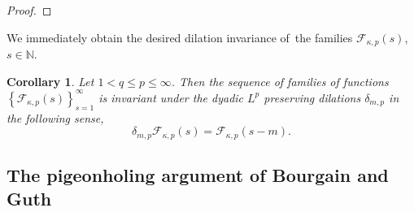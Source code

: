 \documentclass{amsart}%
\theoremstyle{plain}
\newtheorem{corollary}[theorem]{Corollary}
\numberwithin{equation}{section}
\begin{document}
\begin{proof}
\end{proof}

We immediately obtain the desired dilation invariance of\ the families
$\mathcal{F}_{\kappa,p}\left(  s\right)  $, $s\in\mathbb{N}$.

\begin{corollary}
\label{F inv}Let $1<q\leq p\leq\infty$. Then the sequence of families of
functions $\left\{  \mathcal{F}_{\kappa,p}\left(  s\right)  \right\}
_{s=1}^{\infty}$ is invariant under the dyadic $L^{p}$ preserving dilations
$\delta_{m,p}$ in the following sense,%
\[
\delta_{m,p}\mathcal{F}_{\kappa,p}\left(  s\right)  =\mathcal{F}_{\kappa
,p}\left(  s-m\right)  .
\]

\end{corollary}

\subsection{The pigeonholing argument of Bourgain and Guth\label{Sub pigeon}}
\end{document}
